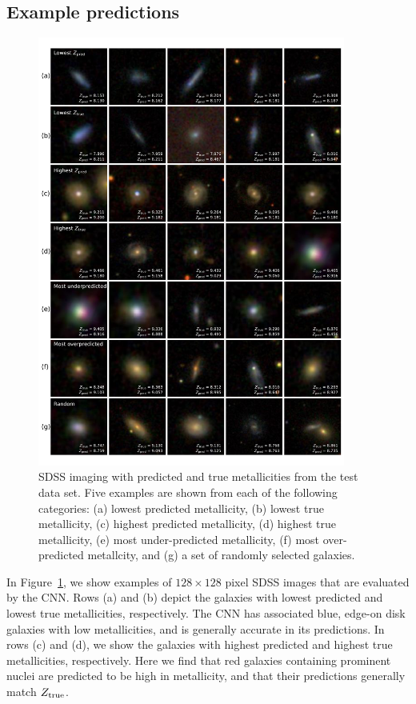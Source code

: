 \documentclass[fleqn,usenatbib]{mnras}
\begin{document}
\subsection{Example predictions}
\begin{figure}
	\includegraphics[width=0.9\textwidth]{01-prediction_examples.pdf}
	\caption{\label{fig:examples}
		SDSS imaging with predicted and true metallicities from the test data set. Five examples are shown from each of the following categories: (a) lowest predicted metallicity, (b) lowest true metallicity, (c) highest predicted metallicity, (d) highest true metallicity, (e) most under-predicted metallicity, (f) most over-predicted metallcity, and (g) a set of randomly selected galaxies.}
\end{figure}

In Figure~\ref{fig:examples}, we show examples of $128 \times 128$ pixel \sdssi\sdssr\sdssg{} SDSS images that are evaluated by the CNN. Rows (a) and (b) depict the galaxies with lowest predicted and lowest true metallicities, respectively. The CNN has associated blue, edge-on disk galaxies with low metallicities, and is generally accurate in its predictions. In rows (c) and (d), we show the galaxies with highest predicted and highest true metallicities, respectively. Here we find that red galaxies containing prominent nuclei are predicted to be high in metallicity, and that their predictions generally match $Z_{\rm true}$.
\end{document}

